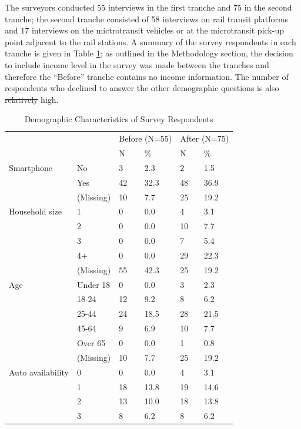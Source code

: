 \documentclass[smartcities,article,submit,moreauthors,pdftex]{Definitions/mdpi}
\providecommand{\DIFdel}[1]{{\protect\color{red}\sout{#1}}}                      %
\providecommand{\DIFdelbegin}{} %
\providecommand{\DIFdelend}{} %
\begin{document}
The surveyors conducted 55 interviews in the first tranche and 75 in the second tranche; the second tranche consisted of 58 interviews on rail transit platforms and 17 interviews on the mictrotransit vehicles or at the microtransit pick-up point adjacent to the rail stations. A summary of the survey respondents in each tranche is given in Table \ref{tab:survey-respondents}; as outlined in the Methodology section, the decision to include income level in the survey was made between the tranches and therefore the “Before” tranche contains no income information. The number of respondents who declined to answer the other demographic questions is also \DIFdelbegin \DIFdel{relatively }\DIFdelend high.

\begin{table}[ht]
    \centering
    \caption{Demographic Characteristics of Survey Respondents}
    \label{tab:survey-respondents}
 \renewcommand{\arraystretch}{1.5}
\begin{tabular}[t]{llllll}
\toprule
\multicolumn{2}{c}{ } & \multicolumn{2}{c}{Before (N=55)} & \multicolumn{2}{c}{After (N=75)} \\
\cmidrule(l{3pt}r{3pt}){3-4} \cmidrule(l{3pt}r{3pt}){5-6}
  &    & N & \% & N  & \% \\
\midrule
Smartphone & No & 3 & 2.3 & 2 & 1.5\\
 & Yes & 42 & 32.3 & 48 & 36.9\\
 & (Missing) & 10 & 7.7 & 25 & 19.2\\
Household size & 1 & 0 & 0.0 & 4 & 3.1\\
 & 2 & 0 & 0.0 & 10 & 7.7\\
 & 3 & 0 & 0.0 & 7 & 5.4\\
 & 4+ & 0 & 0.0 & 29 & 22.3\\
 & (Missing) & 55 & 42.3 & 25 & 19.2\\
Age & Under 18 & 0 & 0.0 & 3 & 2.3\\
 & 18-24 & 12 & 9.2 & 8 & 6.2\\
 & 25-44 & 24 & 18.5 & 28 & 21.5\\
 & 45-64 & 9 & 6.9 & 10 & 7.7\\
 & Over 65 & 0 & 0.0 & 1 & 0.8\\
 & (Missing) & 10 & 7.7 & 25 & 19.2\\
Auto availability & 0 & 0 & 0.0 & 4 & 3.1\\
 & 1 & 18 & 13.8 & 19 & 14.6\\
 & 2 & 13 & 10.0 & 18 & 13.8\\
 & 3 & 8 & 6.2 & 8 & 6.2\\

\end{tabular}
\end{table}
\end{document}
